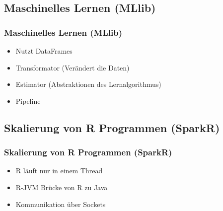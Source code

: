 \documentclass[hyperref={pdfpagelabels=false}]{beamer}
\begin{document}
\subsection{Maschinelles Lernen (MLlib)}
\begin{frame} [t]
\frametitle{Maschinelles Lernen (MLlib)}

\begin{itemize}
	\item Nutzt DataFrames
	\item Transformator (Verändert die Daten)
	\item Estimator (Abstraktionen des Lernalgorithmus)
	\item Pipeline
\end{itemize}

 {
	\begin{figure}[h]
		\centering
	\end{figure}
}

\end{frame}

\subsection{Skalierung von R Programmen (SparkR)}
\begin{frame} [t]
\frametitle{Skalierung von R Programmen (SparkR)}

\begin{itemize}
	\item R läuft nur in einem Thread
	\item R-JVM Brücke von R zu Java
	\item Kommunikation über Sockets 
\end{itemize}

 {
	\begin{figure}[h]
		\centering
	\end{figure}
}

\end{frame}
\end{document}
